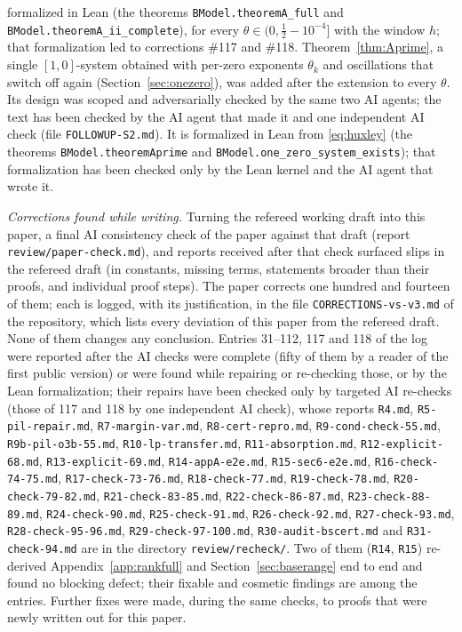 formalized in Lean (the theorems \texttt{BModel.theoremA\_full} and \texttt{BModel.theoremA\_ii\_complete}), for every
$\theta\in(0,\tfrac12-10^{-4}]$ with the window $h$; that formalization led to corrections \#117 and \#118. Theorem~\ref{thm:Aprime}, a single $[1,0]$-system obtained with per-zero exponents $\theta_k$
and oscillations that switch off again (Section~\ref{sec:onezero}), was added after the extension to every $\theta$. Its design was
scoped and adversarially checked by the same two AI agents; the text has been checked by the AI agent that made it and one
independent AI check (file \texttt{FOLLOWUP-S2.md}). It is formalized in Lean from \eqref{eq:huxley} (the theorems
\texttt{BModel.theoremAprime} and \texttt{BModel.one\_zero\_system\_exists}); that formalization has been checked only by the
Lean kernel and the AI agent that wrote it.

\begingroup\sloppy
\emph{Corrections found while writing.} Turning the refereed working draft into this paper, a final AI consistency check of
the paper against that draft (report \texttt{review/paper-check.md}), and reports received after that check surfaced slips in the
refereed draft (in constants, missing
terms, statements broader than their proofs, and individual proof steps). The paper corrects one hundred and fourteen of them; each is logged,
with its justification, in the file \texttt{CORRECTIONS-vs-v3.md} of the repository, which lists every deviation of this paper
from the refereed draft. None of them changes any conclusion. Entries 31--112, 117 and 118 of the log were reported after the AI checks were complete (fifty of them
by a reader of the first public version) or were found while repairing or re-checking those, or by the Lean formalization; their repairs have been checked only
by targeted AI re-checks (those of 117 and 118 by one independent AI check), whose reports \texttt{R4.md}, \texttt{R5-pil-repair.md}, \texttt{R7-margin-var.md},
\texttt{R8-cert-repro.md}, \texttt{R9-cond-check-55.md}, \texttt{R9b-pil-o3b-55.md}, \texttt{R10-lp-transfer.md}, \texttt{R11-absorption.md}, \texttt{R12-explicit-68.md}, \texttt{R13-explicit-69.md}, \texttt{R14-appA-e2e.md}, \texttt{R15-sec6-e2e.md}, \texttt{R16-check-74-75.md}, \texttt{R17-check-73-76.md}, \texttt{R18-check-77.md}, \texttt{R19-check-78.md}, \texttt{R20-check-79-82.md}, \texttt{R21-check-83-85.md}, \texttt{R22-check-86-87.md}, \texttt{R23-check-88-89.md}, \texttt{R24-check-90.md}, \texttt{R25-check-91.md}, \texttt{R26-check-92.md}, \texttt{R27-check-93.md}, \texttt{R28-check-95-96.md}, \texttt{R29-check-97-100.md}, \texttt{R30-audit-bscert.md} and \texttt{R31-check-94.md} are in the directory
\texttt{review/recheck/}. Two of them (\texttt{R14}, \texttt{R15}) re-derived Appendix~\ref{app:rankfull} and
Section~\ref{sec:baserange} end to end and found no blocking defect; their fixable and cosmetic findings are among the entries.
Further fixes were made, during the same checks, to proofs that were newly written out for this
paper.\par\endgroup

